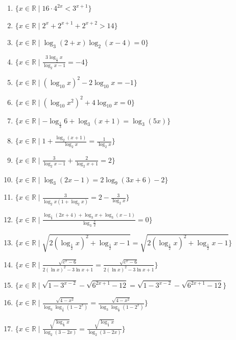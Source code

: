 \documentclass[11pt,a4paper]{article}
\begin{document}
\begin{enumerate}
\item $\displaystyle \{x \in \mathbb{R} \mid 16 \cdot 4^{2x} < 3^{x+1}\}$
\item $\displaystyle \{x \in \mathbb{R} \mid 2^{x} + 2^{x+1} + 2^{x+2} > 14\}$
\item $\displaystyle \{x \in \mathbb{R} \mid \log_{3}(2 + x)\log_{2}(x - 4) = 0\}$
\item $\displaystyle \{x \in \mathbb{R} \mid \frac{3\log_{\frac{1}{2}} x}{\log_{2} x - 1} = -4\}$
\item $\displaystyle \{x \in \mathbb{R} \mid \left(\log_{10} x\right)^{2} - 2\log_{10} x = -1\}$
\item $\displaystyle \{x \in \mathbb{R} \mid \left(\log_{10} x^{2}\right)^{2} + 4\log_{10} x = 0\}$
\item $\displaystyle \{x \in \mathbb{R} \mid -\log_{\frac{1}{3}} 6 + \log_{3}(x + 1) = \log_{3}(5x)\}$
\item $\displaystyle \{x \in \mathbb{R} \mid 1 + \frac{\log_{2}(x + 1)}{\log_{2} x} = \frac{1}{\log_{2} x}\}$
\item $\displaystyle \{x \in \mathbb{R} \mid \frac{3}{\log_{2} x - 1} + \frac{2}{\log_{2} x + 1} = 2\}$
\item $\displaystyle \{x \in \mathbb{R} \mid \log_{3}(2x - 1) = 2\log_{9}(3x + 6) - 2\}$
\item $\displaystyle \{x \in \mathbb{R} \mid \frac{3}{\log_{2} x(1 + \log_{2} x)} = 2 - \frac{3}{\log_{2} x}\}$
\item $\displaystyle \{x \in \mathbb{R} \mid \frac{\log_{\frac{1}{3}}(2x + 4) + \log_{3} x + \log_{3}(x - 1)}{\log_{3}\frac{x}{2}} = 0\}$
\item $\displaystyle \{x \in \mathbb{R} \mid \sqrt{2\left(\log_{\frac{1}{2}} x\right)^{2} + \log_{\frac{1}{2}} x - 1} = \sqrt{2\left(\log_{\frac{1}{2}} x\right)^{2} + \log_{\frac{1}{2}} x - 1}\}$
\item $\displaystyle \{x \in \mathbb{R} \mid \frac{\sqrt{e^{x} - 6}}{2\left(\ln x\right)^{2} - 3\ln x + 1} = \frac{\sqrt{e^{x} - 6}}{2\left(\ln x\right)^{2} - 3\ln x + 1}\}$
\item $\displaystyle \{x \in \mathbb{R} \mid \sqrt{1 - 3^{x-2}} - \sqrt{6^{2x+1} - 12} = \sqrt{1 - 3^{x-2}} - \sqrt{6^{2x+1} - 12}\}$
\item $\displaystyle \{x \in \mathbb{R} \mid \frac{\sqrt{4 - x^{2}}}{\log_{3}\log_{\frac{1}{2}}(1 - 2^{x})} = \frac{\sqrt{4 - x^{2}}}{\log_{3}\log_{\frac{1}{2}}(1 - 2^{x})}\}$
\item $\displaystyle \{x \in \mathbb{R} \mid \frac{\sqrt{\log_{\frac{1}{3}} x}}{\log_{2}(3 - 2x)} = \frac{\sqrt{\log_{\frac{1}{3}} x}}{\log_{2}(3 - 2x)}\}$

\end{enumerate}
\end{document}
